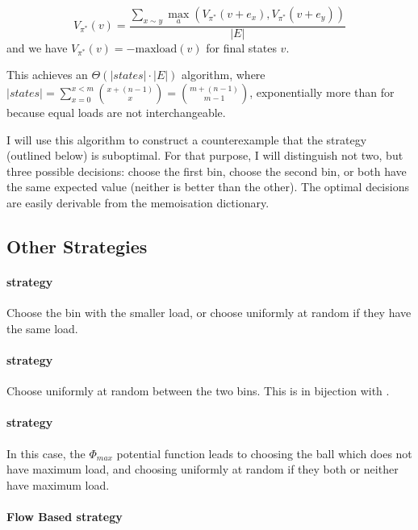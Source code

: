 \begin{equation} \label{eq:graphicaltwochoice-dynamicprogramming}
    V_{\pi^*}(v) = \frac{\sum_{x\sim y}\max_a (V_{\pi^*}(v+e_x), V_{\pi^*}(v+e_y))}{|E|}
\end{equation}
and we have $V_{\pi^*}(v)=-\mathrm{maxload}(v)$ for final states $v$.

This achieves an $\Theta(|states|\cdot |E|)$ algorithm, where $|states| = \sum_{x=0}^{x<m} {{x+(n-1)} \choose {x}} = {{m+(n-1)} \choose {m-1}}$, exponentially more than for \TwoThinning because equal loads are not interchangeable.

I will use this algorithm to construct a counterexample that the \Greedy strategy (outlined below) is suboptimal. For that purpose, I will distinguish not two, but three possible decisions: choose the first bin, choose the second bin, or both have the same expected value (neither is better than the other). The optimal decisions are easily derivable from the memoisation dictionary.


\subsection{Other Strategies} \label{graphical-otherstrategies}


\paragraph{\Greedy strategy} Choose the bin with the smaller load, or choose uniformly at random if they have the same load.


\paragraph{\Random strategy} Choose uniformly at random between the two bins. This is in bijection with \OneChoice.


\paragraph{\LocalRewardOptimiser strategy} In this case, the $\Phi_{max}$ potential function leads to choosing the ball which does not have maximum load, and choosing uniformly at random if they both or neither have maximum load.


\paragraph{Flow Based strategy}

